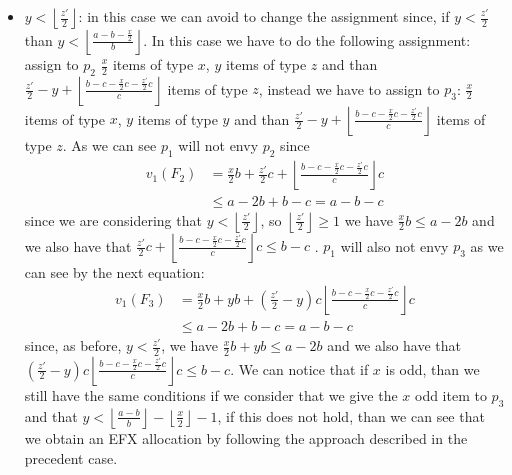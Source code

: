 \documentclass{article}
\newcommand{\floor}[3][2]{\left \lfloor\frac{#2}{#3}\right \rfloor}
\begin{document}
\begin{itemize}
\begin{itemize}
\begin{itemize}
            \item $y < \floor{z'}{2}$: in this case we can avoid to change the assignment since, if $y< \frac{z'}{2}$ than $y < \left \lfloor \frac{a-b-\frac{x}{2}}{b}\right \rfloor$.
            In this case we have to do the following assignment: assign to $p_2$ $\frac{x}{2}$ items of type $x$, $y$ items of type $z$ and than $\frac{z'}{2}-y + \floor{b-c-\frac{x}{2}c - \frac{z'}{2}c}{c}$ items of type $z$, instead we have to assign to $p_3$: $\frac{x}{2}$ items of type $x$, $y$ items of type $y$ and than $\frac{z'}{2}-y + \floor{b-c-\frac{x}{2}c - \frac{z'}{2}c}{c}$ items of type $z$. As we can see $p_1$ will not envy $p_2$ since 
            \begin{align*}
                v_1(F_2) &= \frac{x}{2}b + \frac{z'}{2}c + \floor{b-c-\frac{x}{2}c - \frac{z'}{2}c}{c} c \\
                & \le a-2b + b - c = a- b - c
            \end{align*}    
            since we are considering that $y<\floor{z'}{2}$, so $\floor{z'}{2} \ge 1$ we have $ \frac{x}{2}b \le a-2b$ and we also have that $\frac{z'}{2}c + \floor{b-c-\frac{x}{2}c - \frac{z'}{2}c}{c} c \le b-c$ . 
            $p_1$ will also not envy $p_3$ as we can see by the next equation:
            \begin{align*}
                v_1(F_3) &= \frac{x}{2}b + yb + (\frac{z'}{2}-y)c \floor{b-c-\frac{x}{2}c - \frac{z'}{2}c}{c} c \\
                & \le a-2b + b - c = a- b - c
            \end{align*}
            since, as before,  $y<\frac{z'}{2}$, we have $\frac{x}{2}b + yb\le a-2b$ and we also have that $(\frac{z'}{2}-y)c \floor{b-c-\frac{x}{2}c - \frac{z'}{2}c}{c} c \le b-c$.
            We can notice that if $x$ is odd, than we still have the same conditions if we consider that we give the $x$ odd item to $p_3$ and that $y < \floor{a-b}{b} - \floor{x}{2} - 1$, if this does not hold, than we can see that we obtain an EFX allocation by following the approach described in the precedent case.
         \end{itemize}
         

\end{itemize}
\end{itemize}
\end{document}
